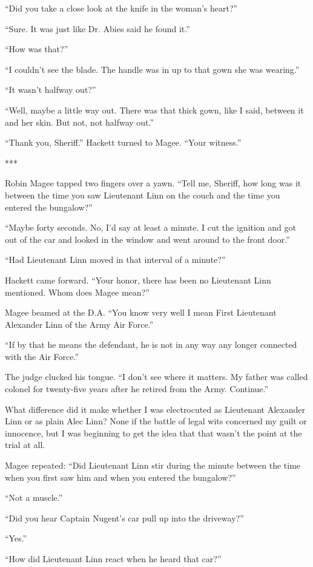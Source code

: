 \documentclass{novel}
\begin{document}
{“Did you take a close look at the knife in the woman’s heart?”

“Sure. It was just like Dr. Abies said he found it.”

“How was that?”

“I couldn’t see the blade. The handle was in up to that gown she was wearing.”

“It wasn’t halfway out?”

“Well, maybe a little way out. There was that thick gown, like I said, between it and her skin. But not, not halfway out.”

“Thank you, Sheriff.” Hackett turned to Magee. “Your witness.”

***

Robin Magee tapped two fingers over a yawn. “Tell me, Sheriff, how long was it between the time you saw Lieutenant Linn on the couch and the time you entered the bungalow?”

“Maybe forty seconds. No, I’d say at least a minute. I cut the ignition and got out of the car and looked in the window and went around to the front door.”

“Had Lieutenant Linn moved in that interval of a minute?”

Hackett came forward. “Your honor, there has been no Lieutenant Linn mentioned. Whom does Magee mean?”

Magee beamed at the D.A. “You know very well I mean First Lieutenant Alexander Linn of the Army Air Force.”

“If by that he means the defendant, he is not in any way any longer connected with the Air Force.”

The judge clucked his tongue. “I don’t see where it matters. My father was called colonel for twenty-five years after he retired from the Army. Continue.”

What difference did it make whether I was electrocuted as Lieutenant Alexander Linn or as plain Alec Linn? None if the battle of legal wits concerned my guilt or innocence, but I was beginning to get the idea that that wasn’t the point at the trial at all.

Magee repeated: “Did Lieutenant Linn stir during the minute between the time when you first saw him and when you entered the bungalow?”

“Not a muscle.”

“Did you hear Captain Nugent’s car pull up into the driveway?”

“Yes.”

“How did Lieutenant Linn react when he heard that car?”

}
\end{document}

